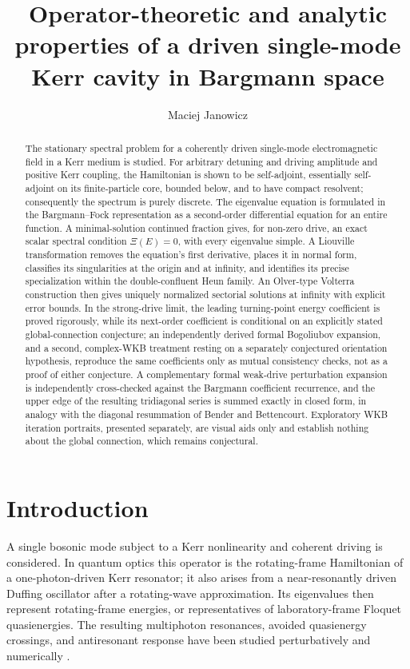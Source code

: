 \documentclass[11pt]{article}
\title{Operator-theoretic and analytic properties of a driven
single-mode Kerr cavity in Bargmann space}
\author{Maciej Janowicz}
\date{}
\theoremstyle{remark}
\begin{document}
\maketitle

\begin{abstract}
The stationary spectral problem for a coherently driven single-mode
electromagnetic field in a Kerr medium is studied.  For arbitrary detuning
and driving amplitude and positive Kerr coupling, the Hamiltonian is shown
to be self-adjoint, essentially self-adjoint on its finite-particle core,
bounded below, and to have compact resolvent; consequently the spectrum is
purely discrete.  The eigenvalue equation is formulated in the
Bargmann--Fock representation as a second-order differential equation for
an entire function.  A minimal-solution continued fraction gives, for non-zero drive,
an exact scalar spectral condition $\Xi(E)=0$, with every eigenvalue simple.
A Liouville transformation removes the equation's first derivative, places
it in normal form, classifies its singularities at the origin and at
infinity, and identifies its precise specialization within the
double-confluent Heun family.  An Olver-type Volterra construction then
gives uniquely normalized sectorial solutions at infinity with explicit
error bounds.  In the strong-drive limit, the leading turning-point energy
coefficient is proved rigorously, while its next-order coefficient is
conditional on an explicitly stated global-connection conjecture; an
independently derived formal Bogoliubov expansion, and a second,
complex-WKB treatment resting on a separately conjectured orientation
hypothesis, reproduce the same coefficients only as mutual consistency
checks, not as a proof of either conjecture.  A complementary formal
weak-drive perturbation expansion is independently cross-checked against
the Bargmann coefficient recurrence, and the upper edge of the resulting
tridiagonal series is summed exactly in closed form, in analogy with the
diagonal resummation of Bender and Bettencourt.  Exploratory WKB iteration
portraits, presented separately, are visual aids only and establish
nothing about the global connection, which remains conjectural.
\end{abstract}

\section{Introduction}
\label{sec:introduction}

A single bosonic mode subject to a Kerr nonlinearity and coherent
driving is considered.  In quantum optics this operator is the rotating-frame Hamiltonian of
a one-photon-driven Kerr resonator; it also arises from a near-resonantly
driven Duffing oscillator after a rotating-wave approximation.  Its
eigenvalues then represent rotating-frame energies, or representatives of
laboratory-frame Floquet quasienergies.  The resulting multiphoton resonances,
avoided quasienergy crossings, and antiresonant response have been studied
perturbatively and numerically
\cite{DykmanFistul2005Antiresonance,PeanoThorwart2006Duffing,LeytonPeanoThorwart2012Noise}.
\end{document}

